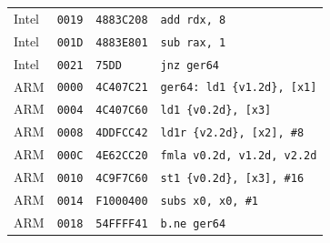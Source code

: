 \begin{table}[htbp]
\begin{tabular}{@{}l|l|l|p{7.2cm}@{}}
Intel & \texttt{0019} & \texttt{4883C208} & \texttt{add rdx, 8} \\
Intel & \texttt{001D} & \texttt{4883E801} & \texttt{sub rax, 1} \\
Intel & \texttt{0021} & \texttt{75DD} & \texttt{jnz ger64} \\
\midrule
ARM & \texttt{0000} & \texttt{4C407C21} & \texttt{ger64: ld1 \{v1.2d\}, [x1]} \\
ARM & \texttt{0004} & \texttt{4C407C60} & \texttt{ld1 \{v0.2d\}, [x3]} \\
ARM & \texttt{0008} & \texttt{4DDFCC42} & \texttt{ld1r \{v2.2d\}, [x2], \#8} \\
ARM & \texttt{000C} & \texttt{4E62CC20} & \texttt{fmla v0.2d, v1.2d, v2.2d} \\
ARM & \texttt{0010} & \texttt{4C9F7C60} & \texttt{st1 \{v0.2d\}, [x3], \#16} \\
ARM & \texttt{0014} & \texttt{F1000400} & \texttt{subs x0, x0, \#1} \\
ARM & \texttt{0018} & \texttt{54FFFF41} & \texttt{b.ne ger64} \\
\bottomrule
\end{tabular}
\endgroup
\end{table}
\noindent{}\par
